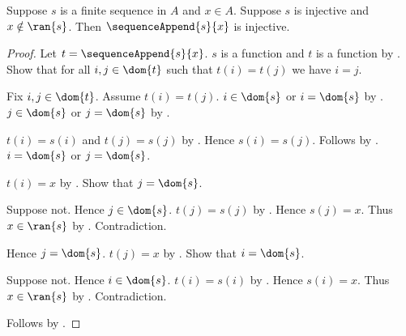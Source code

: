 \begin{proposition}\label{monoid_sequence_append_injective_intro}
    Suppose $s$ is a finite sequence in $A$ and $x\in A$.
    Suppose $s$ is injective and $x\notin\ran{s}$.
    Then $\sequenceAppend{s}{x}$ is injective.
\end{proposition}
\begin{proof}
    Let $t=\sequenceAppend{s}{x}$.
    $s$ is a function and $t$ is a function by
        .
    Show that for all $i,j\in\dom{t}$ such that $t(i)=t(j)$ we have
        $i=j$.
    \begin{subproof}
        Fix $i,j\in\dom{t}$.
        Assume $t(i)=t(j)$.
        $i\in\dom{s}$ or $i=\dom{s}$ by
            .
        $j\in\dom{s}$ or $j=\dom{s}$ by
            .
        \begin{byCase}
            $t(i)=s(i)$ and $t(j)=s(j)$ by
                .
            Hence $s(i)=s(j)$.
            Follows by .
            $i=\dom{s}$ or $j=\dom{s}$.
            \begin{byCase}
                $t(i)=x$ by .
                Show that $j=\dom{s}$.
                \begin{subproof}
                    Suppose not.
                    Hence $j\in\dom{s}$.
                    $t(j)=s(j)$ by .
                    Hence $s(j)=x$.
                    Thus $x\in\ran{s}$ by .
                    Contradiction.
                \end{subproof}
                Hence $j=\dom{s}$.
                $t(j)=x$ by .
                Show that $i=\dom{s}$.
                \begin{subproof}
                    Suppose not.
                    Hence $i\in\dom{s}$.
                    $t(i)=s(i)$ by .
                    Hence $s(i)=x$.
                    Thus $x\in\ran{s}$ by .
                    Contradiction.
                \end{subproof}
            \end{byCase}
        \end{byCase}
    \end{subproof}
    Follows by .
\end{proof}

